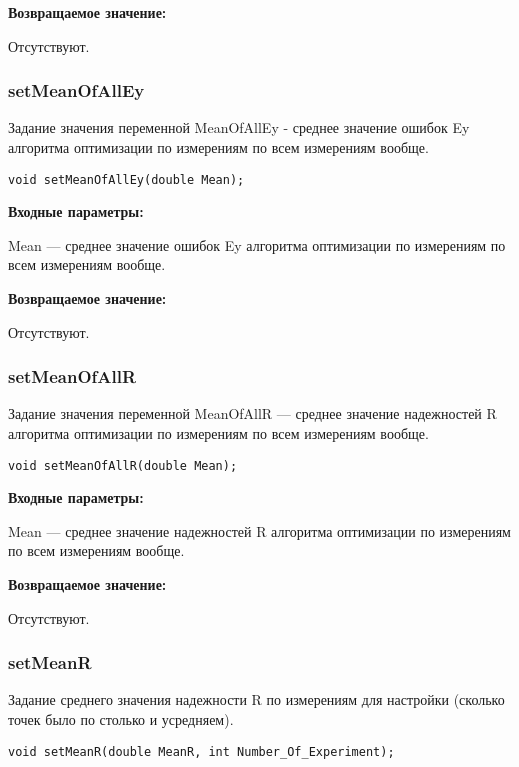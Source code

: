 \documentclass[a4paper,12pt]{article}
\begin{document}
\textbf{Возвращаемое значение:}

Отсутствуют.


\subsubsection{setMeanOfAllEy}\label{setMeanOfAllEy}

Задание значения переменной MeanOfAllEy - среднее значение ошибок Ey алгоритма оптимизации по измерениям по всем измерениям вообще.


\begin{lstlisting}[label=code_syntax_setMeanOfAllEy,caption=Синтаксис]
void setMeanOfAllEy(double Mean);
\end{lstlisting}

\textbf{Входные параметры:}

Mean --- среднее значение ошибок Ey алгоритма оптимизации по измерениям по всем измерениям вообще.

\textbf{Возвращаемое значение:}

Отсутствуют.


\subsubsection{setMeanOfAllR}\label{setMeanOfAllR}

Задание значения переменной MeanOfAllR --- среднее значение надежностей R алгоритма оптимизации по измерениям по всем измерениям вообще.


\begin{lstlisting}[label=code_syntax_setMeanOfAllR,caption=Синтаксис]
void setMeanOfAllR(double Mean);
\end{lstlisting}

\textbf{Входные параметры:}

Mean --- среднее значение надежностей R алгоритма оптимизации по измерениям по всем измерениям вообще.

\textbf{Возвращаемое значение:}

Отсутствуют.


\subsubsection{setMeanR}\label{setMeanR}

Задание среднего значения надежности R по измерениям для настройки (сколько точек было по столько и усредняем).


\begin{lstlisting}[label=code_syntax_setMeanR,caption=Синтаксис]
void setMeanR(double MeanR, int Number_Of_Experiment);
\end{lstlisting}
\end{document}
